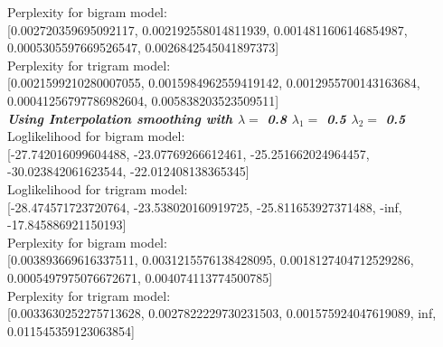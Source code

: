 \documentclass[11ppt]{article}
\begin{document}
Perplexity for bigram model: \\ \vspace{1mm}  [0.002720359695092117, 0.002192558014811939, 0.0014811606146854987, 0.0005305597669526547, 0.0026842545041897373]  \\ \vspace{2mm}
Perplexity for trigram model: \\ \vspace{1mm}  [0.0021599210280007055, 0.0015984962559419142, 0.0012955700143163684, 0.00041256797786982604, 0.005838203523509511]  \\ \vspace{2mm}
\textit{\textbf{Using Interpolation smoothing with $\lambda = $ 0.8 $\lambda_{1} = $ 0.5 $\lambda_{2} = $ 0.5}} \\ \vspace{2mm}
Loglikelihood for bigram model: \\ \vspace{1mm}  [-27.742016099604488, -23.07769266612461, -25.251662024964457, -30.023842061623544, -22.012408138365345]  \\ \vspace{2mm}
Loglikelihood for trigram model: \\ \vspace{1mm}  [-28.474571723720764, -23.538020160919725, -25.811653927371488, -inf, -17.845886921150193]  \\ \vspace{2mm}
Perplexity for bigram model: \\ \vspace{1mm}  [0.003893669616337511, 0.0031215576138428095, 0.0018127404712529286, 0.0005497975076672671, 0.004074113774500785]  \\ \vspace{2mm}
Perplexity for trigram model: \\ \vspace{1mm}  [0.0033630252275713628, 0.0027822229730231503, 0.001575924047619089, inf, 0.011545359123063854]  \\ \vspace{2mm}
\end{document}
